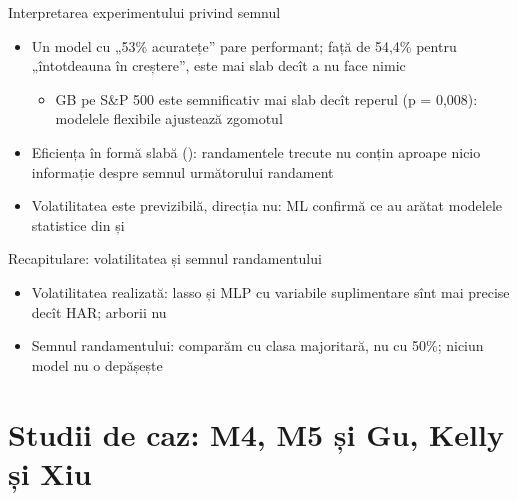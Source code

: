 \begin{frame}{Interpretarea experimentului privind semnul}
\itemsize{\small}
\begin{itemize}
    \item Un model cu „53\% acuratețe” pare performant; față de 54{,}4\% pentru „întotdeauna în creștere”, este mai slab decît a nu face nimic
    \begin{itemize}
        \item GB pe S\&P 500 este semnificativ mai slab decît reperul (p = 0{,}008): modelele flexibile ajustează zgomotul
    \end{itemize}
    \item Eficiența în formă slabă (): randamentele trecute nu conțin aproape nicio informație despre semnul următorului randament
    \item Volatilitatea este previzibilă, direcția nu: ML confirmă ce au arătat modelele statistice din  și 
\end{itemize}
\end{frame}

\begin{frame}{Recapitulare: volatilitatea și semnul randamentului}
\itemsize{\small}
\begin{itemize}
    \item Volatilitatea realizată: lasso și MLP cu variabile suplimentare sînt mai precise decît HAR; arborii nu
    \item Semnul randamentului: comparăm cu clasa majoritară, nu cu 50\%; niciun model nu o depășește
\end{itemize}
\end{frame}


\section{Studii de caz: M4, M5 și Gu, Kelly și Xiu}


